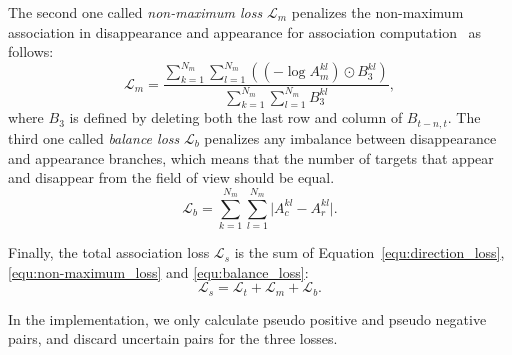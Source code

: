 \documentclass[acmsmall]{acmart}
\begin{document}
{The second one called} \emph{non-maximum loss} $\mathcal L_{m}$ penalizes the non-maximum association in disappearance and appearance for association computation~\cite{dan} as follows: 
\begin{equation} \label{equ:non-maximum_loss}
\mathcal L_m = \frac{ \sum_{k=1}^{N_m} \sum_{l=1}^{N_m} \left( \left(-\log A_m^{kl} \right) \odot {B}_3^{kl} \right)}{\sum_{k=1}^{N_m} \sum_{l=1}^{N_m} B_3^{kl}},
\end{equation}
where $B_3$ is defined by deleting both the last row and column of $B_{t-n,t}$. 
{The third one called} \emph{balance loss} $\mathcal L_b$ penalizes any imbalance between disappearance and appearance branches, 
which means that the number of targets that appear and disappear from the field of view should be equal.
\begin{equation} \label{equ:balance_loss}
\mathcal L_b =  \sum_{k=1}^{N_m} \sum_{l=1}^{N_m} \lvert A_c^{kl} - A_r^{kl} \rvert. 
\end{equation}

Finally, the total association loss $\mathcal L_s$ is the sum of Equation~\ref{equ:direction_loss}, \ref{equ:non-maximum_loss} and \ref{equ:balance_loss}{:} 
\begin{equation} \label{equ:association_loss}
\mathcal L_{s} = \mathcal L_t + \mathcal L_m + \mathcal L_b{.}
\end{equation} 

{
In the implementation, we only calculate pseudo positive and pseudo negative pairs, and discard uncertain pairs for the three losses.
}
\end{document}
